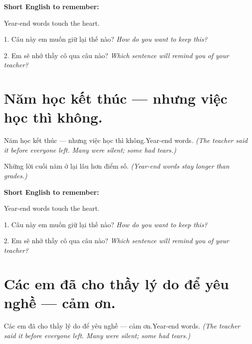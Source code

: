 \begin{ghinhoanh}
\textbf{Short English to remember:}

Year-end words touch the heart.

\end{ghinhoanh}

\begin{tuhocnhanh}
1. Câu này em muốn giữ lại thế nào? \textit{How do you want to keep this?}

2. Em sẽ nhớ thầy cô qua câu nào? \textit{Which sentence will remind you of your teacher?}
\end{tuhocnhanh}
\ngancach


\section{Năm học kết thúc — nhưng việc học thì không.}
\begin{truyen}{Năm học kết thúc — nhưng việc học thì không.}{Year-end words.}
\textit{(The teacher said it before everyone left. Many were silent; some had tears.)}
\end{truyen}

\begin{baihoc}
Những lời cuối năm ở lại lâu hơn điểm số.
\textit{(Year-end words stay longer than grades.)}
\end{baihoc}

\begin{ghinhoanh}
\textbf{Short English to remember:}

Year-end words touch the heart.

\end{ghinhoanh}

\begin{tuhocnhanh}
1. Câu này em muốn giữ lại thế nào? \textit{How do you want to keep this?}

2. Em sẽ nhớ thầy cô qua câu nào? \textit{Which sentence will remind you of your teacher?}
\end{tuhocnhanh}
\ngancach


\section{Các em đã cho thầy lý do để yêu nghề — cảm ơn.}
\begin{truyen}{Các em đã cho thầy lý do để yêu nghề — cảm ơn.}{Year-end words.}
\textit{(The teacher said it before everyone left. Many were silent; some had tears.)}
\end{truyen}

